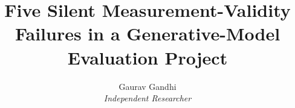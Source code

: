 \documentclass[11pt]{article}
\title{Five Silent Measurement-Validity Failures in a Generative-Model Evaluation Project}
\author{Gaurav Gandhi \\ \textit{Independent Researcher}}
\date{}
\begin{document}
\maketitle

\begin{abstract}

\end{abstract}


\end{document}
